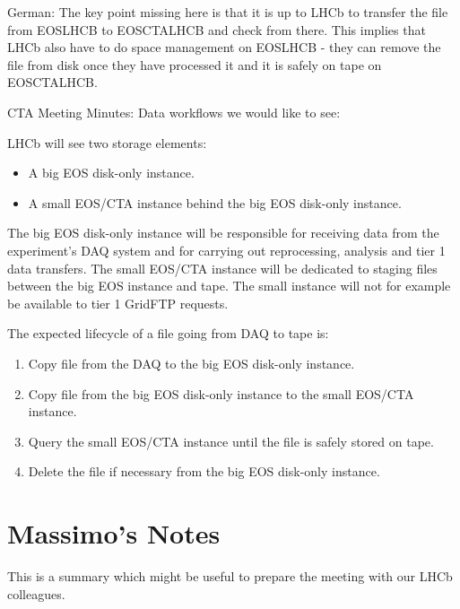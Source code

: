 \documentclass{lhcb+cta}
\begin{document}
German: The key point missing here is that it is up to LHCb to transfer the file from EOSLHCB to EOSCTALHCB and check from there. This implies that LHCb also have to do space management on EOSLHCB - they can remove the file from disk once they have processed it and it is safely on tape on EOSCTALHCB.

CTA Meeting Minutes: Data workflows we would like to see:

LHCb will see two storage elements:

\begin{itemize}
    \item A big EOS disk-only instance.
    \item A small EOS/CTA instance behind the big EOS disk-only instance.
\end{itemize}
        
The big EOS disk-only instance will be responsible for receiving data from the experiment's DAQ system and for carrying out reprocessing, analysis and tier 1 data transfers. The small EOS/CTA instance will be dedicated to staging files between the big EOS instance and tape.  The small instance will not for example be available to tier 1 GridFTP requests.

The expected lifecycle of a file going from DAQ to tape is:
\begin{enumerate}
    \item Copy file from the DAQ to the big EOS disk-only instance.
    \item Copy file from the big EOS disk-only instance to the small EOS/CTA instance.
    \item Query the small EOS/CTA instance until the file is safely stored on tape.
    \item Delete the file if necessary from the big EOS disk-only instance.
\end{enumerate}

\section*{Massimo's Notes}

This is a summary which might be useful to prepare the meeting with our LHCb colleagues.
\end{document}
